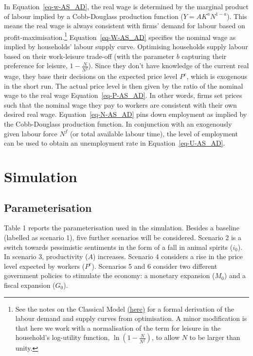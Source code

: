 \documentclass[
  letterpaper,
  DIV=11,
  numbers=noendperiod]{scrreprt}
\begin{document}
In Equation~\ref{eq-w-AS_AD}, the real wage is determined by the
marginal product of labour implied by a Cobb-Douglass production
function (\(Y=AK^aN^{1-a}\)). This means the real wage is always
consistent with firms' demand for labour based on
profit-maximisation.\footnote{See the notes on the Classical Model
  \href{https://karstenkohlercom.files.wordpress.com/2022/03/neoclassical_model.pdf}{(\underline{here})}
  for a formal derivation of the labour demand and supply curves from
  optimisation. A minor modification is that here we work with a
  normalisation of the term for leisure in the household's log-utility
  function, \(\ln(1-\frac{N}{N^f})\), to allow \(N\) to be larger than
  unity.} Equation~\ref{eq-W-AS_AD} specifies the nominal wage as
implied by households' labour supply curve. Optimising households supply
labour based on their work-leisure trade-off (with the parameter \(b\)
capturing their preference for leisure, \(1-\frac{N}{N^f}\)). Since they
don't have knowledge of the current real wage, they base their decisions
on the expected price level \(P^e\), which is exogenous in the short
run. The actual price level is then given by the ratio of the nominal
wage to the real wage Equation~\ref{eq-P-AS_AD}. In other words, firms
set prices such that the nominal wage they pay to workers are consistent
with their own desired real wage. Equation~\ref{eq-N-AS_AD} pins down
employment as implied by the Cobb-Douglass production function. In
conjunction with an exogenously given labour force \(N^f\) (or total
available labour time), the level of employment can be used to obtain an
unemployment rate in Equation~\ref{eq-U-AS_AD}.

\section{Simulation}\label{simulation-2}

\subsection{Parameterisation}\label{parameterisation-2}

Table 1 reports the parameterisation used in the simulation. Besides a
baseline (labelled as scenario 1), five further scenarios will be
considered. Scenario 2 is a switch towards pessimistic sentiments in the
form of a fall in animal spirits (\(i_0\)). In scenario 3, productivity
(\(A\)) increases. Scenario 4 considers a rise in the price level
expected by workers (\(P^e\)). Scenarios 5 and 6 consider two different
government policies to stimulate the economy: a monetary expansion
(\(M_0\)) and a fiscal expansion (\(G_0\)).
\end{document}
